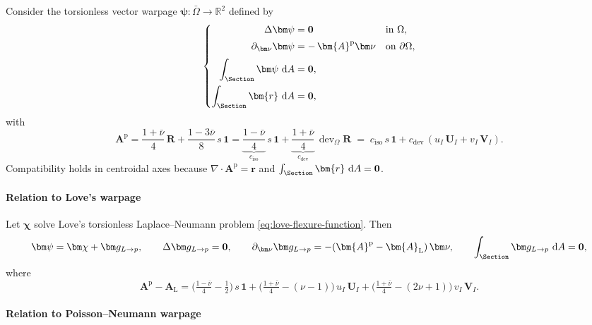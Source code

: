 Consider the torsionless vector warpage $\bm\psi:\bar\Omega\to\mathbb R^2$ defined by
\begin{equation}
\left\{
\begin{aligned}
\Delta \bm\psi &= \mathbf{0} && \text{in }\Omega,\\[2pt]
\partial_{\bm\nu}\bm\psi &= -\,\bm{A}^{\mathrm p} \bm\nu && \text{on }\partial\Omega,\\[2pt]
\displaystyle\int_{\Section}\bm\psi\mathrm{~d}A &=\mathbf{0}, \\ 
\int_{\Section}\bm{r}\mathrm{~d}A&=\mathbf{0},
\end{aligned}
\right.
\end{equation}
with
\begin{equation}
\bm{A}^{\mathrm p}
=\frac{1+\bar{\nu}}{4}\,\bm R+\frac{1-3\bar{\nu}}{8}\,s\,\bm 1
=\underbrace{\frac{1-\bar{\nu}}{4}}_{c_{\mathrm{iso}}}\,s\,\bm 1
+\underbrace{\frac{1+\bar{\nu}}{4}}_{c_{\mathrm{dev}}}\,\operatorname{dev}_{\Omega}\bm R
\;=\;c_{\mathrm{iso}}\,s\,\bm 1+c_{\mathrm{dev}}\,(u_I\,\bm U_I+v_I\,\bm V_I).
\end{equation}
Compatibility holds in centroidal axes because $\nabla\cdot\bm{A}^{\mathrm p}=\bm{r}$ and $\int_{\Section}\bm{r}\mathrm{~d}A=\mathbf{0}$.

\paragraph{Relation to Love's warpage}

Let $\bm\chi$ solve Love’s torsionless Laplace–Neumann problem \cref{eq:love-flexure-function}. 
Then
\[
\bm\psi=\bm\chi+\bm g_{L\to p},\qquad
\Delta \bm g_{L\to p}=\mathbf{0},\qquad
\partial_{\bm\nu}\bm g_{L\to p}=-(\bm{A}^{\mathrm p}-\bm{A}_{\mathrm L})\,\bm\nu,\qquad
\int_{\Section}\bm g_{L\to p}\mathrm{~d}A=\mathbf{0},
\]
where
\[
\bm{A}^{\mathrm p}-\bm{A}_{\mathrm L}
=\Big(\tfrac{1-\bar{\nu}}{4}-\tfrac12\Big)\,s\,\bm 1
+\Big(\tfrac{1+\bar{\nu}}{4}-(\nu-1)\Big)\,u_I\,\bm U_I
+\Big(\tfrac{1+\bar{\nu}}{4}-(2\nu+1)\Big)\,v_I\,\bm V_I.
\]

\paragraph{Relation to Poisson–Neumann warpage}

